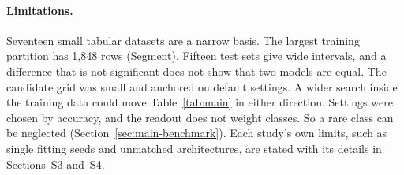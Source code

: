 \paragraph{Limitations.}
Seventeen small tabular datasets are a narrow basis. The largest training partition has 1,848 rows (Segment). Fifteen test sets give wide intervals, and a difference that is not significant does not show that two models are equal. The candidate grid was small and anchored on default settings. A wider search inside the training data could move Table~\ref{tab:main} in either direction. Settings were chosen by accuracy, and the readout does not weight classes. So a rare class can be neglected (Section~\ref{sec:main-benchmark}). Each study's own limits, such as single fitting seeds and unmatched architectures, are stated with its details in Sections~S3 and~S4.
